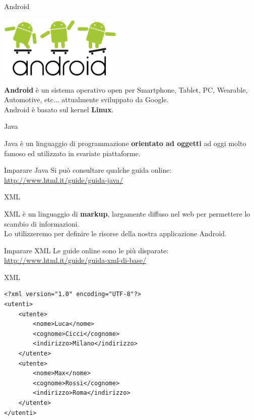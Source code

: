 \documentclass[xcolor=svgnames,11pt]{beamer}
\begin{document}
\begin{frame}[fragile]{Android}

\begin{center}
\includegraphics[height=3cm]{android_logo.pdf}
\end{center}
\pause
\textbf{Android} \`e un sistema operativo open per Smartphone, Tablet, PC, Wearable, Automotive, etc... attualmente sviluppato da Google.\\
\pause
Android \`e basato sul kernel \textbf{Linux}.
\end{frame}

\begin{frame}{Java}

Java \`e un linguaggio di programmazione \textbf{orientato ad oggetti} ad oggi molto famoso ed utilizzato in svariate piattaforme.
\pause
\begin{center}
\end{center}
\pause
\begin{block}{Imparare Java}
Si pu\`o consultare qualche guida online: \url{ http://www.html.it/guide/guida-java/}
\end{block}

\end{frame}

\begin{frame}{XML}

XML \`e un linguaggio di \textbf{markup}, largamente diffuso nel web per permettere lo scambio di informazioni.\\
\pause
\medskip
Lo utilizzeremo per definire le risorse della nostra applicazione Android.\\
\medskip
\pause
\begin{block}{Imparare XML}
Le guide online sono le pi\`u disparate: \url{http://www.html.it/guide/guida-xml-di-base/}
\end{block}

\end{frame}

\begin{frame}[fragile]{XML}

\begin{lstlisting}
<?xml version="1.0" encoding="UTF-8"?>
<utenti>
    <utente>
        <nome>Luca</nome>
        <cognome>Cicci</cognome>
        <indirizzo>Milano</indirizzo>
    </utente>
    <utente>
        <nome>Max</nome>
        <cognome>Rossi</cognome>
        <indirizzo>Roma</indirizzo>
    </utente>
</utenti>
\end{lstlisting}

\end{frame}
\end{document}
